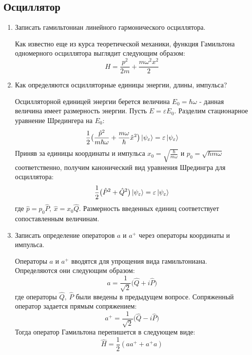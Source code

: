 \documentclass{article}
\begin{document}
\subsection*{Осциллятор}
\begin{enumerate}
	\item {Записать гамильтониан линейного гармонического осциллятора.}
	
	Как известно еще из курса теоретической механики, функция Гамильтона одномерного осциллятора выглядит следующим образом:
	\begin{equation}
		H = \frac{p^2}{2m} + \frac{m\omega^2 x^2}{2}
	\end{equation}
	
	\item {Как определяются осцилляторные единицы энергии, длины, импульса?}
	
	Осцилляторной единицей энергии берется величина $E_0 = \hbar\omega$ - данная величина имеет размерность энергии. Пусть $E = \varepsilon E_0$. Разделим стационарное уравнение Шредингера на $E_0$:
	\begin{equation}
		\frac{1}{2}\big( \frac{\hat{p}^2}{m\hbar\omega} + \frac{m\omega}{\hbar}\hat{x}^2 \big)\ket{\psi_\varepsilon} = \varepsilon \ket{\psi_\varepsilon}
	\end{equation}
	Приняв за единицы координаты и импульса $x_0 = \sqrt{\frac{\hbar}{m\omega}}$ и $p_0 = \sqrt{\hbar m \omega}$ соответственно, получим канонический вид уравнения Шредингра для осциллятора:
	\begin{equation}
		\frac{1}{2}\big( \hat{P}^2 + \hat{Q}^2\big) \ket{\psi_\varepsilon} = \varepsilon \ket{\psi_\varepsilon}
	\end{equation}
	где $\hat{p} = p_0 \hat{P}, \ \hat{x} = x_0 \hat{Q}$. Размерность введенных единиц соответствует сопоставленным величинам.
	
	\item {Записать определение операторов $a$ и $a^+$ через операторы координаты и импульса.}
	
	Операторы $a$ и $a^+$ вводятся для упрощения вида гамильтониана. Определяются они следующим образом:
	\begin{equation}
		a = \frac{1}{\sqrt{2}}\big( \hat{Q} + i \hat{P} \big)
	\end{equation}
	где операторы $\hat{Q}, \ \hat{P}$ были введены в предыдущем вопросе. Сопряженный оператор задается прямым сопряжением:
	\begin{equation}
		a^+ = \frac{1}{\sqrt{2}}\big( \hat{Q} - i \hat{P} \big)
	\end{equation}
	Тогда оператор Гамильтона перепишется в следующем виде:
	\begin{equation}
		\hat{H} = \frac{1}{2}(aa^+ + a^+ a) \label{oscillatorFirst}
	\end{equation}
	

\end{enumerate}
\end{document}

